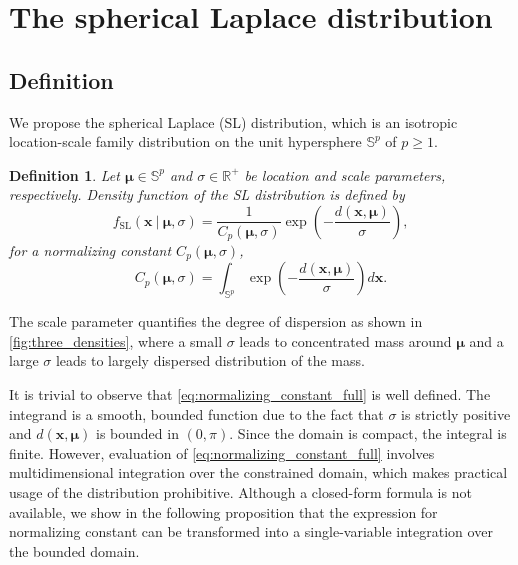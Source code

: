 \documentclass[10pt]{article}
\newtheorem{definition}{Definition}
\newcommand{\bfx}{\mathbf{x}}
\newcommand{\bfmu}{\boldsymbol{\mu}}
\newcommand{\bbS}{\mathbb{S}}
\newcommand{\bbRpos}{\mathbb{R}^+}
\newcommand{\fSL}{f_{\textrm{SL}}}
\begin{document}
\section{The spherical Laplace distribution}\label{sec3:SL}
\subsection{Definition}

We propose the spherical Laplace (SL) distribution, which is an isotropic location-scale family distribution on the unit hypersphere $\bbS^p$ of $p\geq 1$. 

\begin{definition} Let $\bfmu \in \bbS^p$ and $\sigma \in \bbRpos$ be location and scale parameters, respectively. Density function of the SL distribution is defined by
	\begin{equation*}
	\fSL (\bfx~|~ \boldsymbol{\mu}, \sigma) = \frac{1}{C_p (\bfmu, \sigma)} \exp \left( -\frac{d(\bfx, \bfmu)}{\sigma} \right),
	\end{equation*}
	for a normalizing constant $C_p (\bfmu, \sigma)$,
	\begin{equation}\label{eq:normalizing_constant_full}
	C_p (\bfmu, \sigma) = \int_{\bbS^p} \exp \left( -\frac{d(\bfx, \bfmu)}{\sigma} \right) d\bfx.
	\end{equation}
\end{definition}
The scale parameter quantifies the degree of dispersion as shown in \figurename \ref{fig:three_densities}, where a small $\sigma$ leads to concentrated mass around $\bfmu$ and a large $\sigma$ leads to largely dispersed distribution of the mass.



It is trivial to observe that \eqref{eq:normalizing_constant_full} is well defined. The integrand is a smooth,  bounded function due to the fact that $\sigma$ is strictly positive and $d(\bfx, \bfmu)$ is bounded in $(0,\pi)$. Since the domain is compact, the integral is finite. However, evaluation of \eqref{eq:normalizing_constant_full} involves multidimensional integration over the constrained domain, which makes practical usage of the distribution prohibitive. Although a closed-form formula is not available, we show in the following proposition that the expression for normalizing constant can be transformed into a single-variable integration over the bounded domain. 
\end{document}
